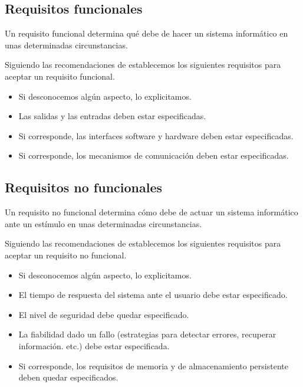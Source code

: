 \subsection{Requisitos funcionales}

Un requisito funcional determina qué debe de hacer un sistema informático en unas determinadas circunstancias.

Siguiendo las recomendaciones de \cite[Checklist: Requirements]{CodeComplete2} establecemos
los siguientes requisitos para aceptar un requisito funcional.

\begin{itemize}
    \item Si desconocemos algún aspecto, lo explicitamos.
    \item Las salidas y las entradas deben estar especificadas.
    \item Si corresponde, las interfaces software y hardware deben
          estar especificadas.
    \item Si corresponde, los mecanismos de comunicación deben estar
          especificadas.
\end{itemize}

\subsection{Requisitos no funcionales}

Un requisito no funcional determina cómo debe de actuar un sistema informático ante un estímulo en unas determinadas circunstancias.

Siguiendo las recomendaciones de \cite[Checklist: Requirements]{CodeComplete2} establecemos
los siguientes requisitos para aceptar un requisito no funcional. 

\begin{itemize}
    \item Si desconocemos algún aspecto, lo explicitamos.
    \item El tiempo de respuesta del sistema ante el usuario debe estar especificado.
    \item El nivel de seguridad debe quedar especificado.
    \item La fiabilidad dado un fallo (estrategias para detectar errores, recuperar información. etc.) debe estar especificada.
    \item Si corresponde, los requisitos de memoria y de almacenamiento persistente deben quedar especificados.
\end{itemize}

